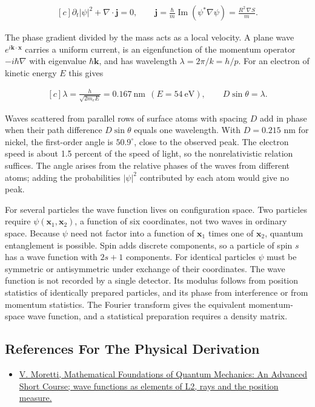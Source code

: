 \documentclass[11pt,oneside]{book}
\newenvironment{centeredalign}{\[\begin{gathered}[c]}{\end{gathered}\]}
\begin{document}
\begin{centeredalign}
\partial_t|\psi|^2+\nabla\cdot\mathbf j=0,\qquad
\mathbf j=\frac{\hbar}{m}\operatorname{Im}(\psi^*\nabla\psi)=\frac{R^2\,\nabla S}{m}.
\end{centeredalign}

The phase gradient divided by the mass acts as a local velocity. A plane wave \(e^{i\mathbf k\cdot\mathbf x}\) carries a uniform current, is an eigenfunction of the momentum operator \(-i\hbar\nabla\) with eigenvalue \(\hbar\mathbf k\), and has wavelength \(\lambda=2\pi/k=h/p\). For an electron of kinetic energy \(E\) this gives

\begin{centeredalign}
\lambda=\frac{h}{\sqrt{2m_eE}}=0.167\ \mathrm{nm}\ \ (E=54\ \mathrm{eV}),\qquad
D\sin\theta=\lambda.
\end{centeredalign}

Waves scattered from parallel rows of surface atoms with spacing \(D\) add in phase when their path difference \(D\sin\theta\) equals one wavelength. With \(D=0.215\) nm for nickel, the first-order angle is \(50.9^\circ\), close to the observed peak. The electron speed is about 1.5 percent of the speed of light, so the nonrelativistic relation suffices. The angle arises from the relative phases of the waves from different atoms; adding the probabilities \(|\psi|^2\) contributed by each atom would give no peak.

For several particles the wave function lives on configuration space. Two particles require \(\psi(\mathbf x_1,\mathbf x_2)\), a function of six coordinates, not two waves in ordinary space. Because \(\psi\) need not factor into a function of \(\mathbf x_1\) times one of \(\mathbf x_2\), quantum entanglement is possible. Spin adds discrete components, so a particle of spin \(s\) has a wave function with \(2s+1\) components. For identical particles \(\psi\) must be symmetric or antisymmetric under exchange of their coordinates. The wave function is not recorded by a single detector. Its modulus follows from position statistics of identically prepared particles, and its phase from interference or from momentum statistics. The Fourier transform gives the equivalent momentum-space wave function, and a statistical preparation requires a density matrix.

\subsection*{References For The Physical Derivation}
\begin{itemize}
\item \href{https://arxiv.org/abs/1508.06951}{V. Moretti, Mathematical Foundations of Quantum Mechanics: An Advanced Short Course; wave functions as elements of L2, rays and the position measure.}
\end{itemize}
\end{document}

